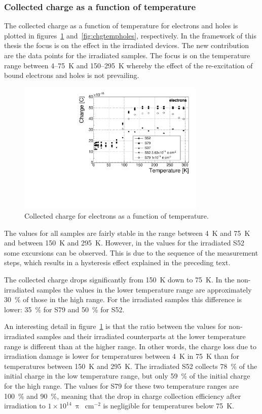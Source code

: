 \subsubsection{Collected charge as a function of temperature}
\label{subsec:qvst}
 The collected charge as a function of temperature for electrons and holes is plotted in figures~\ref{fig:chgtempelecs} and~\ref{fig:chgtempholes}, respectively.
In the framework of this thesis the focus is on the effect in the irradiated devices. The new contribution are the data points for the irradiated samples. The focus is on the temperature range between 4--75~K and 150--295~K whereby the effect of the re-excitation of bound electrons and holes is not prevailing.
\begin{figure}[!t]
\centering
\includegraphics[width=0.80\textwidth]{03_measurement_results/scripts/plots/charge500V} 
\caption{Collected charge for electrons as a function of temperature.}
\label{fig:chgtempelecs}
\end{figure}
The values for all samples are fairly stable in the range between 4~K and 75~K and between 150~K and 295~K. However, in the values for the irradiated S52 some excursions can be observed. This is due to the sequence of the measurement steps, which results in a hysteresis effect explained in the preceding text.

The collected charge drops significantly from 150~K down to 75~K. In the non-irradiated samples the values in the lower temperature range are approximately 30~\% of those in the high range. For the irradiated samples this difference is lower: 35~\% for S79 and 50~\% for S52.

An interesting detail in figure~\ref{fig:chgtempelecs} is that the ratio between the values for non-irradiated samples and their irradiated counterparts at the lower temperature range is different than at the higher range. In other words, the charge loss due to irradiation damage is lower for temperatures between 4~K in 75~K than for temperatures between 150~K and 295~K. The irradiated S52 collects 78~\% of the initial charge in the low temperature range, but only 59~\% of the initial charge for the high range. The values for S79 for these two temperature ranges are 100~\% and 90~\%, meaning that the drop in charge collection efficiency after irradiation to $1\times10^{14}~\uppi$~cm$^{-2}$ is negligible for temperatures below 75~K.

